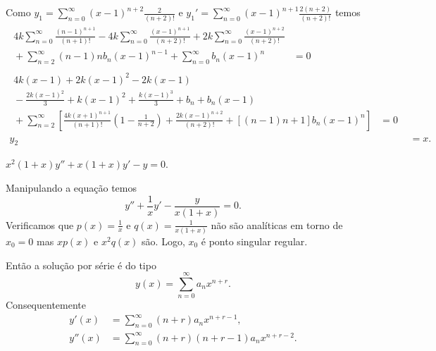 \documentclass[a4paper,12pt, leqno, answers]{exam}
\begin{document}
\begin{questions}
\begin{solution}
        Como $y_1 = \sum_{n = 0}^\infty \left( x - 1 \right)^{n + 2} \frac{2}{\left( n + 2 \right)!}$ e $y_1' = \sum_{n = 0}^\infty \left( x - 1 \right)^{n + 1} \frac{2 \left( n + 2 \right)}{\left( n + 2 \right)!}$ temos
        \begin{align*}
            \begin{split}
                4 k \sum_{n = 0}^\infty \frac{\left( n - 1 \right)^{n + 1}}{\left( n + 1 \right)!} - 4 k \sum_{n = 0}^\infty \frac{\left( x - 1 \right)^{n + 1}}{\left( n + 2 \right)!} + 2 k \sum_{n = 0}^\infty \frac{\left( x - 1 \right)^{n + 2}}{\left( n + 2 \right)!} \\ {}+ \sum_{n = 2}^\infty \left( n - 1 \right) n b_n \left( x - 1 \right)^{n - 1} + \sum_{n = 0}^\infty b_n \left( x - 1 \right)^n &= 0
            \end{split} \\
            \begin{split}
                4 k \left( x - 1 \right) + 2 k \left( x - 1 \right)^2 - 2 k \left( x - 1 \right) \\ {}- \frac{2 k \left( x - 1 \right)^2}{3} + k \left( x - 1 \right)^2 + \frac{k \left( x - 1 \right)^3}{3} + b_n + b_n \left( x - 1 \right) \\ {}+ \sum_{n = 2}^\infty \left[ \frac{4 k \left( x + 1 \right)^{n + 1}}{\left( n + 1 \right)!} \left( 1 - \frac{1}{n + 2} \right) + \frac{2 k \left( x - 1 \right)^{n + 2}}{\left( n + 2 \right)!} + \left[ \left( n - 1 \right) n + 1 \right] b_n \left( x - 1 \right)^n \right] &= 0
            \end{split} \\
            y_2 &= x.
        \end{align*}
    \end{solution}

    \question $x^2 \left( 1 + x \right) y'' + x \left( 1 + x \right) y' - y = 0$.
    \begin{solution}
        Manipulando a equa\c{c}\~{a}o temos
        \[
        y'' + \frac{1}{x} y' - \frac{y}{x \left( 1 + x \right)} = 0.
        \]
        Verificamos que $p(x) = \frac{1}{x}$ e $q(x) = \frac{1}{x \left( 1 + x \right)}$ n\~{a}o s\~{a}o anal\'{i}ticas em torno de $x_0 = 0$ mas $x p(x)$ e $x^2 q(x)$ s\~{a}o. Logo, $x_0$ \'{e} ponto singular regular.

        Ent\~{a}o a solu\c{c}\~{a}o por s\'{e}rie \'{e} do tipo
        \[
        y\left( x \right) = \sum_{n = 0}^\infty a_n x^{n + r}.
        \]
        Consequentemente
        \begin{align*}
            y'(x) &= \sum_{n = 0}^\infty \left( n + r \right) a_n x^{n + r - 1}, \\
            y''(x) &= \sum_{n = 0}^\infty \left( n + r \right) \left( n + r - 1 \right) a_n x^{n + r - 2}.
        \end{align*}


\end{solution}
\end{questions}
\end{document}
